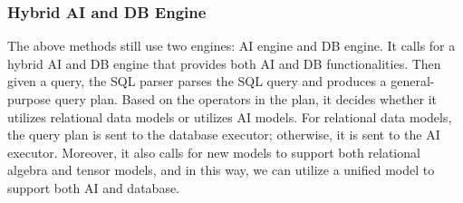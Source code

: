 \subsubsection{Hybrid AI and DB Engine}
\label{subsubsec: engine}

The above methods still use two engines: AI engine and DB engine. It calls for a hybrid AI and DB engine that provides both AI and DB functionalities. Then given a query, the SQL parser parses the SQL query and produces a general-purpose query plan. Based on the operators in the plan, it decides whether it utilizes relational data models or utilizes AI models. For relational data models, the query plan is sent to the database executor; otherwise, it is sent to the AI executor. Moreover, it also calls for new models to support both relational algebra and tensor models, and in this way, we can utilize a unified model to support both AI and database. 














